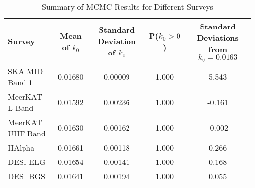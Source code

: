 \documentclass{article}
\begin{document}
\begin{table}[h!]
    \centering
    \caption{Summary of MCMC Results for Different Surveys}
    \begin{tabular}{lcccc}
        \toprule
        \textbf{Survey} & \textbf{Mean of $k_0$} & \textbf{Standard Deviation of $k_0$} & \textbf{P($k_0 > 0$)} & \textbf{Standard Deviations from $k_0=0.0163$} \\
        \midrule
SKA MID Band 1 & 0.01680 & 0.00009 & 1.000 & 5.543 \\
MeerKAT L Band & 0.01592 & 0.00236 & 1.000 & -0.161 \\
MeerKAT UHF Band & 0.01630 & 0.00162 & 1.000 & -0.002 \\
HAlpha & 0.01661 & 0.00118 & 1.000 & 0.266 \\
DESI ELG & 0.01654 & 0.00141 & 1.000 & 0.168 \\
DESI BGS & 0.01641 & 0.00194 & 1.000 & 0.055 \\
        \bottomrule
    \end{tabular}
    \label{tab:mcmc_results}
\end{table}
\end{document}
